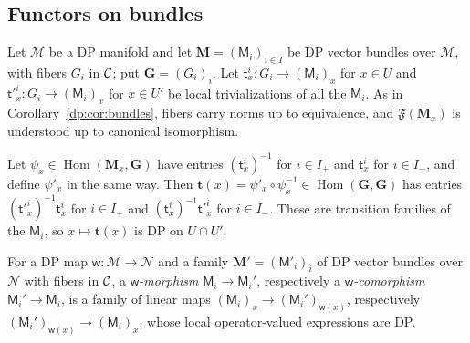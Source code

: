 \subsection{Functors on bundles}

Let $\mathcal M$ be a DP manifold and let $\mathbf M=(\mathsf M_i)_{i\in I}$ be DP vector bundles over $\mathcal M$, with fibers $G_i$ in $\mathcal{C}$; put $\mathbf G=(G_i)_i$. Let $\mathsf t^i_x\colon G_i\to(\mathsf M_i)_x$ for $x\in U$ and $\mathsf t'^i_x\colon G_i\to(\mathsf M_i)_x$ for $x\in U'$ be local trivializations of all the $\mathsf M_i$. As in Corollary~\ref{dp:cor:bundles}, fibers carry norms up to equivalence, and $\mathfrak F(\mathbf M_x)$ is understood up to canonical isomorphism.

Let $\psi_x\in\operatorname{Hom}(\mathbf M_x,\mathbf G)$ have entries $(\mathsf t^i_x)^{-1}$ for $i\in I_+$ and $\mathsf t^i_x$ for $i\in I_-$, and define $\psi'_x$ in the same way. Then $\mathbf t(x)=\psi'_x\circ\psi_x^{-1}\in\operatorname{Hom}(\mathbf G,\mathbf G)$ has entries $(\mathsf t'^i_x)^{-1}\mathsf t^i_x$ for $i\in I_+$ and $(\mathsf t^i_x)^{-1}\mathsf t'^i_x$ for $i\in I_-$. These are transition families of the $\mathsf M_i$, so $x\mapsto\mathbf t(x)$ is DP on $U\cap U'$.

For a DP map $\mathsf w\colon\mathcal M\to\mathcal N$ and a family $\mathbf M'=(\mathsf M'_i)_i$ of DP vector bundles over $\mathcal N$ with fibers in $\mathcal{C}$, a \emph{$\mathsf w$-morphism} $\mathsf M_i\to\mathsf M_i'$, respectively a \emph{$\mathsf w$-comorphism} $\mathsf M_i'\to\mathsf M_i$, is a family of linear maps $(\mathsf M_i)_x\to(\mathsf M_i')_{\mathsf w(x)}$, respectively $(\mathsf M_i')_{\mathsf w(x)}\to(\mathsf M_i)_x$, whose local operator-valued expressions are DP.

